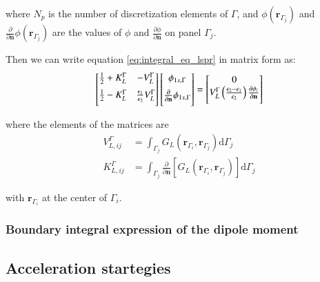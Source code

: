 \noindent where $N_p$ is the number of discretization elements of $\Gamma$, 
and $\phi(\mathbf{r}_{\Gamma_j})$ and $\frac{\partial}{\partial \mathbf{n}} 
\phi(\mathbf{r}_{\Gamma_j})$ are the values of $\phi$ and 
$\frac{\partial \phi}{\partial \mathbf{n}}$ on panel $\Gamma_j$.


Then we can write equation \eqref{eq:integral_eq_lspr} in matrix form as:
%
 \begin{equation} \label{eq:matrix_lspr}
 \left[
    \begin{matrix} 
       \frac{1}{2} + K_{L}^{\Gamma} & -V_{L}^{\Gamma}  \vspace{0.2cm} \\
       \frac{1}{2} - K_{L}^{\Gamma} &  \frac{\epsilon_1}{\epsilon_2} V_{L}^{\Gamma}  \vspace{0.2cm} 
    \end{matrix}
    \right] \left[ 
    \begin{matrix} 
       \phi_{1s,\Gamma} \vspace{0.2cm} \\
       \frac{\partial}{\partial \mathbf{n}} \phi_{1s,\Gamma} \vspace{0.2cm}
    \end{matrix} 
     \right] =   
    \left[
    \begin{matrix} 
       0 \\
       V_{L}^{\Gamma} \left(\frac{\epsilon_2-\epsilon_1}{\epsilon_2}\right) \frac{\partial\phi_i}{\partial\mathbf{n}} \vspace{0.2cm} 
    \end{matrix}
    \right]
 \end{equation}

\noindent where the elements of the matrices are
%
\begin{align} \label{eq:layers_element}
V_{L,ij}^{\Gamma} &= \int_{\Gamma_j} G_L(\mathbf{r}_{\Gamma_i},\mathbf{r}_{\Gamma_j})  \mathrm{d} \Gamma_j \nonumber \\
K_{L,ij}^{\Gamma} &= \int_{\Gamma_j} \frac{\partial}{\partial \mathbf{n}} \left[ G_L(\mathbf{r}_{\Gamma_i},\mathbf{r}_{\Gamma_j}) \right]\mathrm{d} \Gamma_j
\end{align}

\noindent with $\mathbf{r}_{\Gamma_i}$ at the center of $\Gamma_i$.


\subsubsection{Boundary integral expression of the dipole moment}



\subsection{Acceleration startegies} \label{sec:acc_strategies}













